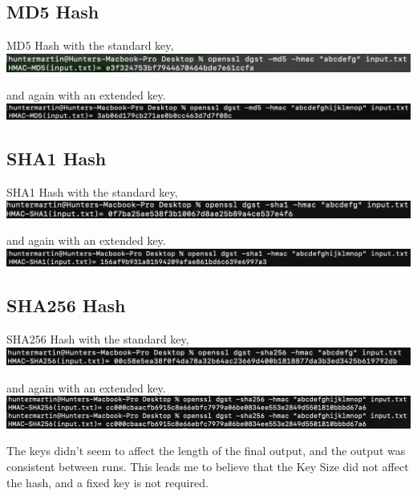 \documentclass{article}
\begin{document}
\subsection{MD5 Hash}
\begin{center}
    MD5 Hash with the standard key,
    \includegraphics[scale=0.65]{md5-1-task2.png}
    
    and again with an extended key.
    \includegraphics[scale=0.65]{md5-2-task2.png}
\end{center}

\subsection{SHA1 Hash}
\begin{center}
    SHA1 Hash with the standard key,
    \includegraphics[scale=0.65]{sha1-1-task2.png}
    
    and again with an extended key.
    \includegraphics[scale=0.65]{sha-2-task2.png}
\end{center}

\subsection{SHA256 Hash}
\begin{center}
    SHA256 Hash with the standard key,
    \includegraphics[scale=0.65]{sha256-1-task2.png}
    
    and again with an extended key.
    \includegraphics[scale=0.65]{sha256-2-task2.png}
\end{center}

The keys didn't seem to affect the length of the final output, and the output was consistent between runs.  This leads me to believe that the Key Size did not affect the hash, and a fixed key is not required.
\end{document}
